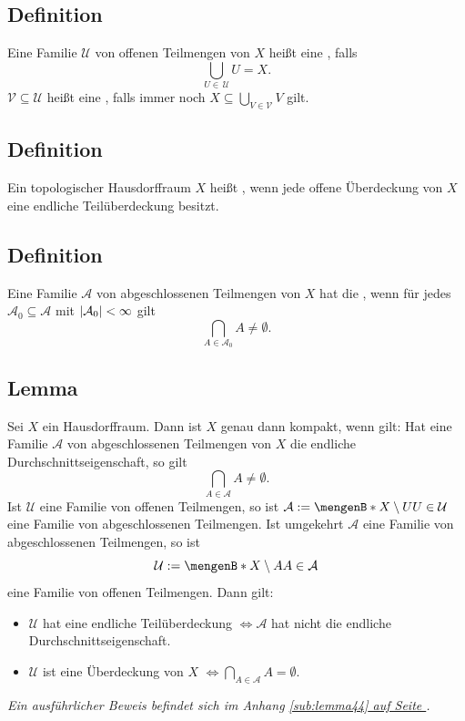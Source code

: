 \subsection[Definition: Offene Überdeckung und Teilüberdeckung]{Definition} %
\label{sub:41}
Eine Familie $\mathcal{U}$ von offenen Teilmengen von $X$ heißt eine , falls 
\[
	\bigcup_{U \in \,\mathcal{U}} U = X.
\] 
$\mathcal{V} \subseteq \mathcal{U} $ heißt eine , falls immer noch $X \subseteq \bigcup_{V \in \mathcal{V} } V$ gilt.

\subsection[Definition: Kompaktheit]{Definition} %
\label{sub:42}
Ein topologischer Hausdorffraum $X$ heißt , wenn jede offene Überdeckung von $X$ eine endliche Teilüberdeckung besitzt.

\subsection[Definition: Endliche Durchschnittseigenschaft]{Definition} %
\label{sub:43}
Eine Familie $\mathcal{A}$ von abgeschlossenen Teilmengen von $X$ hat die , wenn für jedes $\mathcal{A}_0 \subseteq \mathcal{A}$ mit
$\abs*{\mathcal{A}_0 } < \infty$ gilt 
\[
	\bigcap_{A \in \mathcal{A}_0 } A \not= \emptyset.
\]

\subsection[Lemma: Äquivalenz zur Kompaktheit eines Hausdorffraumes]{Lemma} %
\label{sub:44}
Sei $X$ ein Hausdorffraum. Dann ist $X$ genau dann kompakt, wenn gilt: Hat eine Familie $\mathcal{A}$ von abgeschlossenen Teilmengen von $X$ die endliche 
Durchschnittseigenschaft, so gilt 
\[
	\bigcap_{A \in \mathcal{A}} A \not= \emptyset.
\]
Ist $\mathcal{U}$ eine Familie von offenen Teilmengen, so ist $\mathcal{A} := \set[X \setminus U]{U \in \mathcal{U}}$ eine Familie von abgeschlossenen Teilmengen. Ist
umgekehrt $\mathcal{A}$ eine Familie von abgeschlossenen Teilmengen, so ist 
\[
	\mathcal{U} := \set[X \setminus A]{A \in \mathcal{A} } 
\]
eine Familie von offenen Teilmengen.
Dann gilt: 
\begin{itemize}
	\item $\mathcal{U}$ hat eine endliche Teilüberdeckung $\iff \mathcal{A}$ hat nicht die endliche Durchschnittseigenschaft.
	\item $\mathcal{U}$ ist eine Überdeckung von $X$ $\iff \bigcap_{A \in \mathcal{A} }A = \emptyset$. \bewende
\end{itemize}
\emph{Ein ausführlicher Beweis befindet sich im Anhang \hyperref[sub:lemma44]{\ref*{sub:lemma44} auf Seite \pageref*{sub:lemma44}}.}

